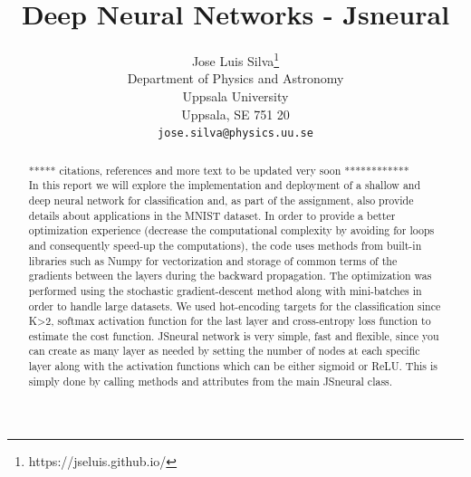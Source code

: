 \documentclass{article}
\title{Deep Neural Networks - Jsneural}
\author{%
  Jose Luis Silva\thanks{https://jseluis.github.io/} \\
  Department of Physics and Astronomy\\
  Uppsala University\\
  Uppsala, SE 751 20 \\
  \texttt{jose.silva@physics.uu.se} \\
}
\begin{document}

\maketitle

\begin{abstract}
***** citations, references and more text to be updated very soon ************\\
In this report we will explore the implementation and deployment of a shallow and deep neural network for classification and, as part of the assignment, also provide details about applications in the MNIST dataset. In order to provide a better optimization experience (decrease the computational complexity by avoiding for loops and consequently speed-up the computations), the code uses methods from built-in libraries such as Numpy for vectorization and storage of common terms of the gradients between the layers during the backward propagation. The optimization was performed using the stochastic gradient-descent method along with mini-batches in order to handle large datasets. We used hot-encoding targets for the classification since K>2, softmax activation function for the last layer and cross-entropy loss function to estimate the cost function. JSneural network is very simple, fast and flexible, since you can create as many layer as needed by setting the number of nodes at each specific layer along with the activation functions which can be either sigmoid or ReLU. This is simply done by calling methods and attributes from the main JSneural class.

\end{abstract}
\end{document}
